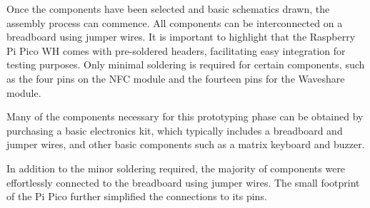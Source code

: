 Once the components have been selected and basic schematics drawn, the assembly process can commence. All components can be 
interconnected on a breadboard using jumper wires. It is important to highlight that the Raspberry Pi Pico WH comes with 
pre-soldered headers, facilitating easy integration for testing purposes. Only minimal soldering is required for certain 
components, such as the four pins on the NFC module and the fourteen pins for the Waveshare module.

Many of the components necessary for this prototyping phase can be obtained by purchasing a basic electronics kit, which 
typically includes a breadboard and jumper wires, and other basic components such as a matrix keyboard and buzzer.

In addition to the minor soldering required, the majority of components were effortlessly connected to the breadboard 
using jumper wires. The small footprint of the Pi Pico further simplified the connections to its pins.

